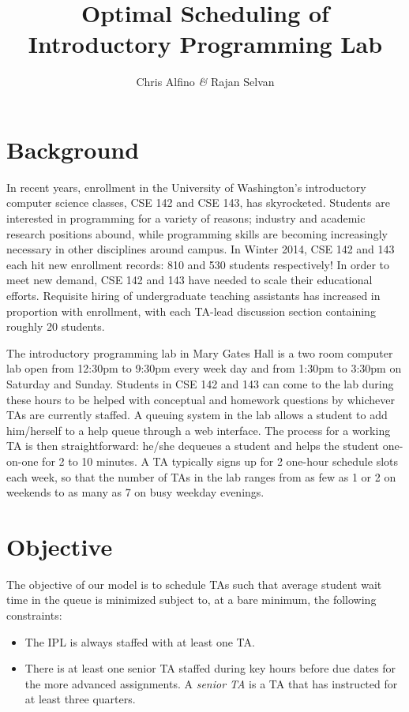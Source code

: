 \documentclass{article}
\begin{document}
\title{\textbf{Optimal Scheduling of Introductory Programming Lab}}
\author{Chris Alfino \textit{\&} Rajan Selvan}
\maketitle

\setlength\columnsep{0.45in}
\setlength{\parskip}{0.5em}
\begin{multicols}{2}

\section*{Background}

In recent years, enrollment in the University of Washington's introductory computer science classes, CSE 142 and CSE 143, has skyrocketed. Students are interested in programming for a variety of reasons; industry and academic research positions abound, while programming skills are becoming increasingly necessary in other disciplines around campus. In Winter 2014, CSE 142 and 143 each hit new enrollment records: 810 and 530 students respectively! In order to meet new demand, CSE 142 and 143 have needed to scale their educational efforts. Requisite hiring of undergraduate teaching assistants has increased in proportion with enrollment, with each TA-lead discussion section containing roughly 20 students.

The introductory programming lab in Mary Gates Hall is a two room computer lab open from 12:30pm to 9:30pm every week day and from 1:30pm to 3:30pm on Saturday and Sunday. Students in CSE 142 and 143 can come to the lab during these hours to be helped with conceptual and homework questions by whichever TAs are currently staffed. A queuing system in the lab allows a student to add him/herself to a help queue through a web interface. The process for a working TA is then straightforward: he/she dequeues a student and helps the student one-on-one for 2 to 10 minutes. A TA typically signs up for 2 one-hour schedule slots each week, so that the number of TAs in the lab ranges from as few as 1 or 2 on weekends to as many as 7 on busy weekday evenings.

\section*{Objective}

The objective of our model is to schedule TAs such that average student wait time in the queue is minimized subject to, at a bare minimum, the following constraints:
\begin{itemize}
    \item The IPL is always staffed with at least one TA.
    \item There is at least one senior TA staffed during key hours before due dates for the more advanced assignments. A \textit{senior TA} is a TA that has instructed for at least three quarters.
\end{itemize}


\end{multicols}
\end{document}
